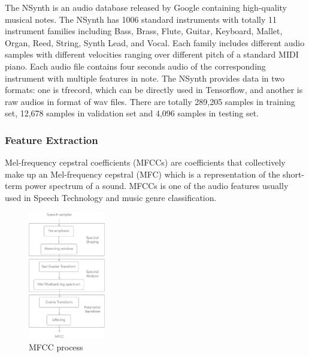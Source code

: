 \documentclass{article}
\begin{document}
The NSynth\cite{nsynth} is an audio database released by Google containing high-quality musical notes. The NSynth has 1006 standard instruments with totally 11 instrument families including Bass, Brass, Flute, Guitar, Keyboard, Mallet, Organ, Reed, String, Synth Lead, and Vocal. Each family includes different audio samples with different velocities ranging over different pitch of a standard MIDI piano. Each audio file contains four seconds audio of the corresponding instrument with multiple features in note. The NSynth provides data in two formats: one is tfrecord, which can be directly used in Tensorflow, and another is raw audios in format of wav files. There are totally 289,205 samples in training set, 12,678 samples in validation set and 4,096 samples in testing set. 

\subsubsection{Feature Extraction}

Mel-frequency cepstral coefficients (MFCCs) are coefficients that collectively make up an Mel-frequency cepstral (MFC) which is a representation of the short-term power spectrum of a sound.\cite{mfcc} MFCCs is one of the audio features usually used in Speech Technology and music genre classification. 

\begin{figure}[h!]
\centering
\includegraphics[width=0.3\textwidth]{mfcc-process.png}
\caption{MFCC process}
\label{fig:mfcc}
\end{figure}
\end{document}
